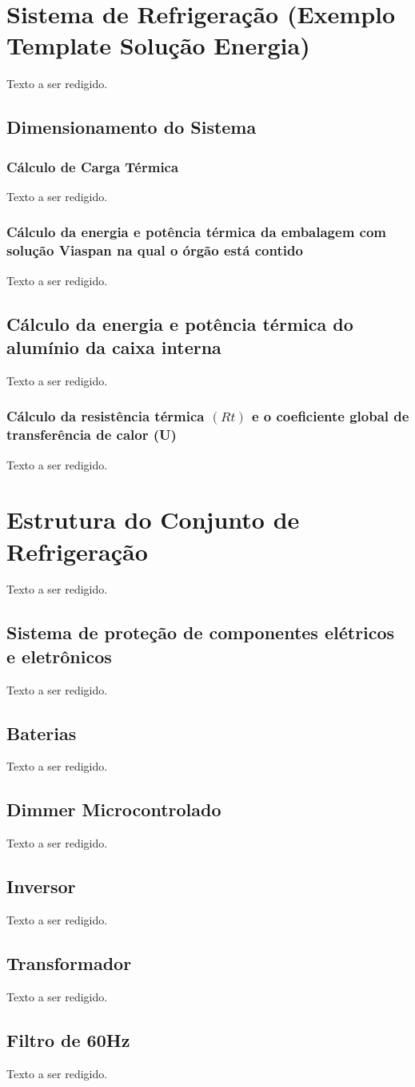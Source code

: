 \section{Sistema de Refrigeração (Exemplo Template Solução Energia)}
Texto a ser redigido.
	\subsection{Dimensionamento do Sistema}
		\subsubsection{Cálculo de Carga Térmica}
		Texto a ser redigido.
	\subsubsection{Cálculo da energia e potência térmica da embalagem com solução Viaspan na qual o órgão está contido}
	Texto a ser redigido.
	\subsection{Cálculo da energia e potência térmica do alumínio da caixa interna}
	Texto a ser redigido.
		\subsubsection{Cálculo da resistência térmica $(Rt)$ e o coeficiente global de transferência de calor (U)}
		Texto a ser redigido.
	 \section{Estrutura do Conjunto de Refrigeração}
	 Texto a ser redigido.
\subsection{Sistema de proteção de componentes elétricos e eletrônicos}
Texto a ser redigido.
\subsection{Baterias}
Texto a ser redigido.
\subsection{Dimmer Microcontrolado}
Texto a ser redigido.
\subsection{Inversor}
Texto a ser redigido.
\subsection{Transformador}
Texto a ser redigido.
	\subsection{Filtro de 60Hz}
Texto a ser redigido.
